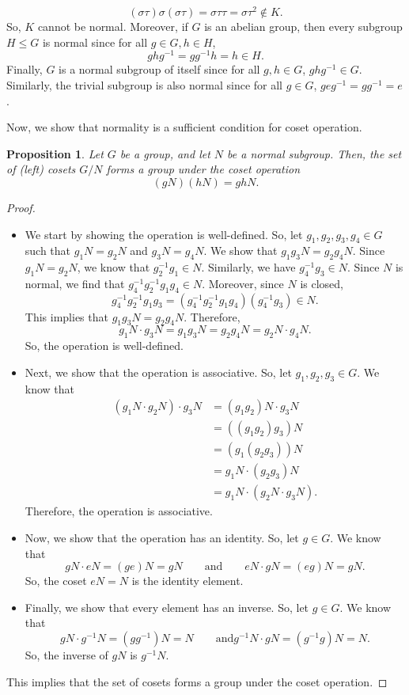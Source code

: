 \documentclass[a4paper, openany]{memoir}
\theoremstyle{definition}
\theoremstyle{plain}
\newtheorem{proposition}[definition]{Proposition}
\begin{document}
\[(\sigma \tau) \sigma (\sigma \tau) = \sigma \tau \tau = \sigma \tau^2 \not\in K.\]
So, $K$ cannot be normal. Moreover, if $G$ is an abelian group, then every subgroup $H \leqslant G$ is normal since for all $g \in G, h \in H$,
\[ghg^{-1} = gg^{-1}h = h \in H.\]
Finally, $G$ is a normal subgroup of itself since for all $g, h \in G$, $ghg^{-1} \in G$. Similarly, the trivial subgroup is also normal since for all $g \in G$, $geg^{-1} = gg^{-1} = e$.

Now, we show that normality is a sufficient condition for coset operation.
\begin{proposition}
Let $G$ be a group, and let $N$ be a normal subgroup. Then, the set of (left) cosets $G/N$ forms a group under the coset operation
\[(gN)(hN) = ghN.\]
\end{proposition}
\begin{proof}
\hspace*{0pt}
\begin{itemize}
    \item We start by showing the operation is well-defined. So, let $g_1, g_2, g_3, g_4 \in G$ such that $g_1N = g_2N$ and $g_3N = g_4N$. We show that $g_1g_3N = g_2g_4N$. Since $g_1N = g_2N$, we know that $g_2^{-1}g_1 \in N$. Similarly, we have $g_4^{-1}g_3 \in N$. Since $N$ is normal, we find that $g_4^{-1} g_2^{-1}g_1 g_4 \in N$. Moreover, since $N$ is closed,
    \[g_4^{-1}g_2^{-1}g_1g_3 = (g_4^{-1} g_2^{-1}g_1 g_4)(g_4^{-1}g_3) \in N.\]
    This implies that $g_1g_3N = g_2g_4N$. Therefore,
    \[g_1N \cdot g_3N = g_1g_3N = g_2g_4N = g_2N \cdot g_4N.\]
    So, the operation is well-defined.
    
    \item Next, we show that the operation is associative. So, let $g_1, g_2, g_3 \in G$. We know that
    \begin{align*}
        (g_1N \cdot g_2N) \cdot g_3N &= (g_1g_2)N \cdot g_3N \\
        &= ((g_1g_2)g_3)N \\
        &= (g_1(g_2g_3))N \\
        &= g_1N \cdot (g_2g_3)N \\
        &= g_1N \cdot (g_2N \cdot g_3N).
    \end{align*}
    Therefore, the operation is associative.
    
    \item Now, we show that the operation has an identity. So, let $g \in G$. We know that
    \[gN \cdot eN = (ge) N = gN \qquad \text{and} \qquad eN \cdot gN = (eg) N = gN.\]
    So, the coset $eN = N$ is the identity element.
    
    \item Finally, we show that every element has an inverse. So, let $g \in G$. We know that
    \[gN \cdot g^{-1}N = (gg^{-1})N = N \qquad \text{and} g^{-1}N \cdot gN = (g^{-1}g) N = N.\]
    So, the inverse of $gN$ is $g^{-1}N$.
\end{itemize}
This implies that the set of cosets forms a group under the coset operation.
\end{proof}
\end{document}
